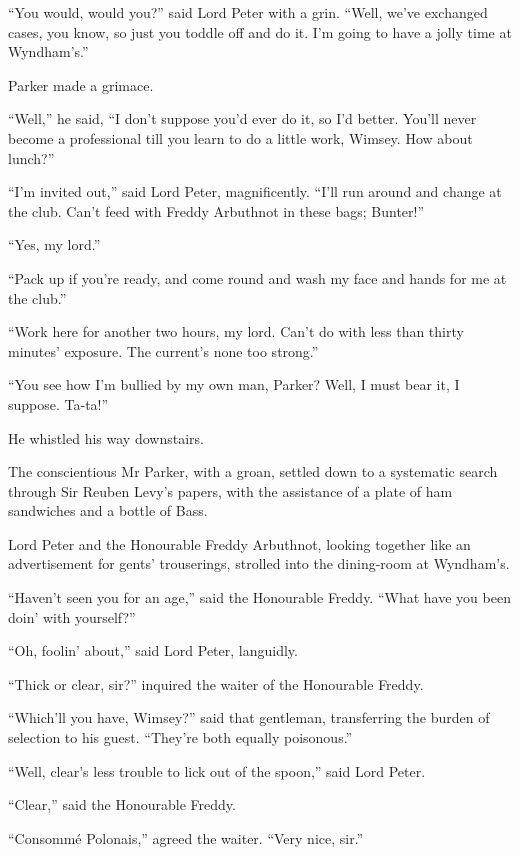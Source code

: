 \enquote{You would, would you?} said Lord Peter with a grin. \enquote{Well, we’ve exchanged cases, you know, so just you toddle off and do it. I’m going to have a jolly time at Wyndham’s.}

Parker made a grimace.

\enquote{Well,} he said, \enquote{I don’t suppose you’d ever do it, so I’d better. You’ll never become a professional till you learn to do a little work, Wimsey. How about lunch?}

\enquote{I’m invited out,} said Lord Peter, magnificently. \enquote{I’ll run around and change at the club. Can’t feed with Freddy Arbuthnot in these bags; Bunter!}

\enquote{Yes, my lord.}

\enquote{Pack up if you’re ready, and come round and wash my face and hands for me at the club.}

\enquote{Work here for another two hours, my lord. Can’t do with less than thirty minutes’ exposure. The current’s none too strong.}

\enquote{You see how I’m bullied by my own man, Parker? Well, I must bear it, I suppose. Ta-ta!}

He whistled his way downstairs.

The conscientious Mr Parker, with a groan, settled down to a systematic search through Sir Reuben Levy’s papers, with the assistance of a plate of ham sandwiches and a bottle of Bass.

Lord Peter and the Honourable Freddy Arbuthnot, looking together like an advertisement for gents’ trouserings, strolled into the dining-room at Wyndham’s.

\enquote{Haven’t seen you for an age,} said the Honourable Freddy. \enquote{What have you been doin’ with yourself?}

\enquote{Oh, foolin’ about,} said Lord Peter, languidly.

\enquote{Thick or clear, sir?} inquired the waiter of the Honourable Freddy.

\enquote{Which’ll you have, Wimsey?} said that gentleman, transferring the burden of selection to his guest. \enquote{They’re both equally poisonous.}

\enquote{Well, clear’s less trouble to lick out of the spoon,} said Lord Peter.

\enquote{Clear,} said the Honourable Freddy.

\enquote{Consommé Polonais,} agreed the waiter. \enquote{Very nice, sir.}

